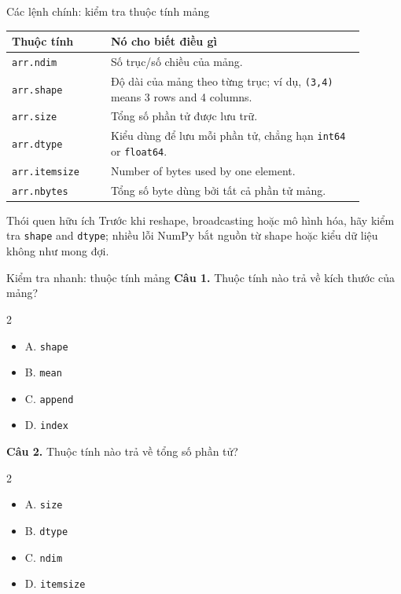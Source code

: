 \documentclass[aspectratio=169,11pt]{beamer}
\newcommand{\quiztitle}[1]{\textbf{\textcolor{QuizOrange}{#1}}}
\begin{document}
\begin{frame}{Các lệnh chính: kiểm tra thuộc tính mảng}
\small
\begin{tabular}{p{0.25\linewidth}p{0.64\linewidth}}
\toprule
\textbf{Thuộc tính} & \textbf{Nó cho biết điều gì} \\
\midrule
\texttt{arr.ndim} & Số trục/số chiều của mảng. \\
\texttt{arr.shape} & Độ dài của mảng theo từng trục; ví dụ, \texttt{(3,4)} means 3 rows and 4 columns. \\
\texttt{arr.size} & Tổng số phần tử được lưu trữ. \\
\texttt{arr.dtype} & Kiểu dùng để lưu mỗi phần tử, chẳng hạn \texttt{int64} or \texttt{float64}. \\
\texttt{arr.itemsize} & Number of bytes used by one element. \\
\texttt{arr.nbytes} & Tổng số byte dùng bởi tất cả phần tử mảng. \\
\bottomrule
\end{tabular}
\begin{block}{Thói quen hữu ích}
Trước khi reshape, broadcasting hoặc mô hình hóa, hãy kiểm tra \texttt{shape} and \texttt{dtype}; nhiều lỗi NumPy bắt nguồn từ shape hoặc kiểu dữ liệu không như mong đợi.
\end{block}
\end{frame}

\begin{frame}{Kiểm tra nhanh: thuộc tính mảng}
\small
\quiztitle{Câu 1.} Thuộc tính nào trả về kích thước của mảng?
\begin{multicols}{2}
\begin{itemize}
  \item A. \texttt{shape}
  \item B. \texttt{mean}
  \item C. \texttt{append}
  \item D. \texttt{index}
\end{itemize}
\end{multicols}
\vspace{0.4em}
\quiztitle{Câu 2.} Thuộc tính nào trả về tổng số phần tử?
\begin{multicols}{2}
\begin{itemize}
  \item A. \texttt{size}
  \item B. \texttt{dtype}
  \item C. \texttt{ndim}
  \item D. \texttt{itemsize}
\end{itemize}
\end{multicols}
\end{frame}
\end{document}
